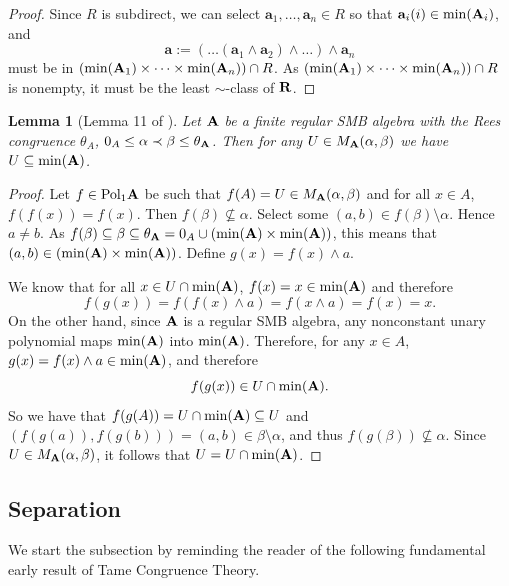 \documentclass[11pt]{amsart}
\newcommand{\m}[1]{{\uppercase {\mathbf {#1}}}}
\newcommand{\poln}[2]{{\rm Pol_{#1}\m #2}}
\newcommand{\mt}{\wedge}
\newtheorem{lm}[thm]{Lemma}
\theoremstyle{definition}
\begin{document}
\begin{proof}
Since $R$ is subdirect, we can select $\mathbf{a}_1,\dots,\mathbf{a}_n\in R$ so that $\mathbf{a}_i(i)\in \mathrm{min}(\m a_i)$, and $$\mathbf{a}:=(\dots(\mathbf{a}_1\mt\mathbf{a}_2)\mt\dots)\mt\mathbf{a}_n$$ must be in $(\mathrm{min}(\m a_1)\times\dots\times\mathrm{min}(\m a_n))\cap R$. As $(\mathrm{min}(\m a_1)\times\dots\times\mathrm{min}(\m a_n))\cap R$ is nonempty, it must be the least $\sim$-class of $\m R$.
\end{proof} 

\begin{lm}[Lemma 11 of \cite{BuSMB}]\label{minsetinmin}
Let $\m a$ be a finite regular SMB algebra with the Rees congruence $\theta_A$, $0_A\leq \alpha\prec\beta\leq \theta_{\m A}$. Then for any $U\in M_{\m a}(\alpha,\beta)$ we have $U\subseteq\mathrm{min}(\m a)$.
\end{lm}

\begin{proof}
Let $f\in\poln{1}{a}$ be such that $f(A)=U\in M_{\m a}(\alpha,\beta)$ and for all $x\in A$, $f(f(x))=f(x)$. Then $f(\beta)\nsubseteq\alpha$. Select some $(a,b)\in f(\beta)\setminus\alpha$. Hence $a\neq b$. As $f(\beta)\subseteq\beta\subseteq\theta_{\m A}=0_A\cup(\mathrm{min}(\m a)\times \mathrm{min}(\m a))$, this means that $(a,b)\in (\mathrm{min}(\m a)\times \mathrm{min}(\m a))$. Define $g(x)=f(x)\mt a$.

We know that for all $x\in U\cap \mathrm{min}(\m a)$, $f(x)=x\in \mathrm{min}(\m a)$ and therefore $$f(g(x))=f(f(x)\mt a)=f(x\mt a)=f(x)=x.$$ On the other hand, since $\m a$ is a regular SMB algebra, any nonconstant unary polynomial maps $\mathrm{min}(\m a)$ into $\mathrm{min}(\m a)$. Therefore, for any $x\in A$, $g(x)=f(x)\mt a\in\mathrm{min}(\m a)$, and therefore $$f(g(x))\in U\cap\mathrm{min}(\m a).$$
So we have that $f(g(A))=U\cap \mathrm{min}(\m a)\subseteq U$ and $(f(g(a)),f(g(b)))=(a,b)\in \beta\setminus\alpha$, and thus $f(g(\beta))\nsubseteq\alpha$. Since $U\in M_{\m a}(\alpha,\beta)$, it follows that $U=U\cap\mathrm{min}(\m a)$.
\end{proof}

\subsection{Separation}

We start the subsection by reminding the reader of the following fundamental early result of Tame Congruence Theory.
\end{document}
